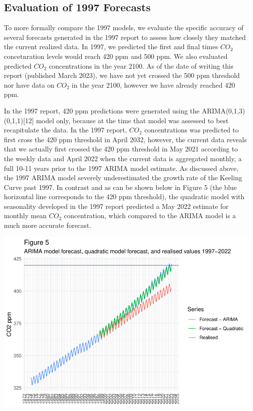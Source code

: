 \documentclass[AER]{AEA}
\begin{document}
\hypertarget{evaluation-of-1997-forecasts}{%
\subsection{Evaluation of 1997
Forecasts}\label{evaluation-of-1997-forecasts}}

To more formally compare the 1997 models, we evaluate the specific
accuracy of several forecasts generated in the 1997 report to assess how
closely they matched the current realized data. In 1997, we predicted
the first and final times \(CO_{2}\) concetnration levels would reach
420 ppm and 500 ppm. We also evaluated predicted \(CO_{2}\)
concentrations in the year 2100. As of the date of writing this report
(published March 2023), we have not yet crossed the 500 ppm threshold
nor have data on \(CO_{2}\) in the year 2100, however we have already
reached 420 ppm.

In the 1997 report, 420 ppm predictions were generated using the
ARIMA(0,1,3)(0,1,1){[}12{]} model only, because at the time that model
was assessed to best recapitulate the data. In the 1997 report,
\(CO_{2}\) concentrations was predicted to first cross the 420 ppm
threshold in April 2032, however, the current data reveals that we
actually first crossed the 420 ppm threshold in May 2021 according to
the weekly data and April 2022 when the current data is aggregated
monthly, a full 10-11 years prior to the 1997 ARIMA model estimate. As
discussed above, the 1997 ARIMA model severely underestimated the growth
rate of the Keeling Curve past 1997. In contrast and as can be shown
below in Figure 5 (the blue horizontal line corresponds to the 420 ppm
threshold), the quadratic model with seasonality developed in the 1997
report predicted a May 2022 estimate for monthly mean \(CO_{2}\)
concentration, which compared to the ARIMA model is a much more accurate
forecast.

\includegraphics{co2_present_files/figure-latex/Plot the monthly series against the forecast-1.pdf}
\end{document}
